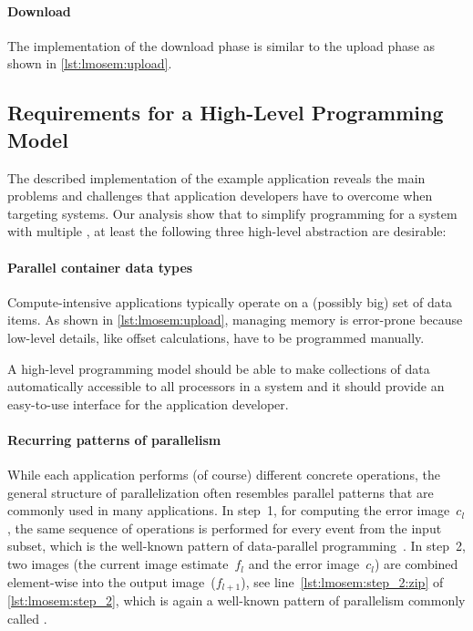 \paragraph{Download}
The implementation of the download phase is similar to the upload phase as shown in \autoref{lst:lmosem:upload}.


\subsection{Requirements for a High-Level Programming Model}
\label{section:requirements}
The described implementation of the example application reveals the main problems and challenges that application developers have to overcome when targeting \GPU systems.
Our analysis show that to simplify programming for a system with multiple \GPUs, at least the following three high-level abstraction are desirable:

\paragraph{Parallel container data types}
Compute-intensive applications typically operate on a (possibly big) set of data items.
As shown in \autoref{lst:lmosem:upload}, managing memory is error-prone because low-level details, like offset calculations, have to be programmed manually.

A high-level programming model should be able to make collections of data automatically accessible to all processors in a system and it should provide an easy-to-use interface for the application developer.

\paragraph{Recurring patterns of parallelism}
While each application performs (of course) different concrete operations, the general structure of parallelization often resembles parallel patterns that are commonly used in many applications.
In step~1, for computing the error image~$c_l$, the same sequence of operations is performed for every event from the input subset, which is the well-known \map pattern of data-parallel programming~\cite{GorlatchCo2011}.
In step~2, two images (the current image estimate~$f_l$ and the error image~$c_l$) are combined element-wise into the output image~($f_{l+1}$), see line~\autoref{lst:lmosem:step_2:zip} of \autoref{lst:lmosem:step_2}, which is again a well-known pattern of parallelism commonly called \zip.

